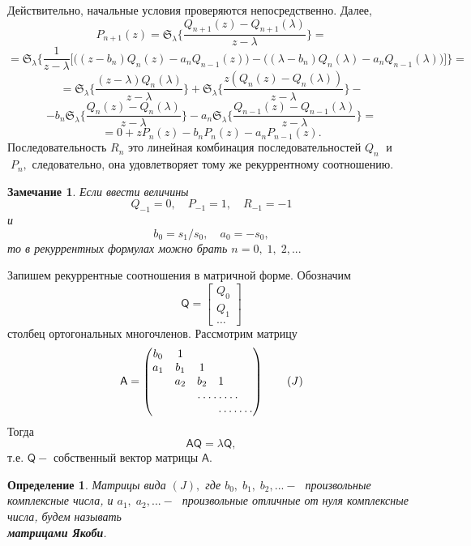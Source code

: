 \documentclass[12 pt, a4 paper]{article}
\theoremstyle{plain}   \newtheorem{Pro}{Задача}
\newtheorem{Def}{Определение}
\newtheorem{Rem}{Замечание}
\begin{document}
Действительно, начальные условия проверяются непосредственно.
Далее,
$$
  P_{n+1}(z)=\mathfrak{S}_{\lambda} \biggl \{
  \frac{Q_{n+1}(z)-Q_{n+1}(\lambda )}{z-\lambda}
  \biggr \}=
$$
$$
  =\mathfrak{S}_{\lambda} \biggl \{
  \frac{1}{z-\lambda} \biggl [ \biggl (
  (z-b_n )Q_n (z)-a_n Q_{n-1}(z) \biggr ) -
  \biggl ( (\lambda -b_n ) Q_n (\lambda ) -
  a_n Q_{n-1} (\lambda ) \biggr ) \biggr ] \biggr \} =
$$
$$
  =\mathfrak{S}_{\lambda} \biggl \{
  \frac{(z-\lambda )Q_n (\lambda ) }{z-\lambda} \biggr \} +
  \mathfrak{S}_{\lambda} \biggl \{
  \frac{z(Q_n (z)-Q_n (\lambda ))}{z-\lambda } \biggr \} -
$$
$$
  -b_n \mathfrak{S}_{\lambda} \biggl \{
  \frac{Q_n (z) - Q_n (\lambda )}{z-\lambda} \biggr \} -
  a_n \mathfrak{S}_{\lambda} \biggl \{
  \frac{Q_{n-1}(z)-Q_{n-1}(\lambda )}{z-\lambda} \biggr \}=
$$
$$
  = 0 + zP_n (z) - b_n P_n (z) -a_n P_{n-1}(z).
$$
Последовательность
$ R_n $
это линейная комбинация последовательностей
$ Q_n \; $
и
$ \; P_n , $
следовательно, она удовлетворяет тому же рекуррентному соотношению.
\\
$ \; $
\begin{Rem}
Если ввести величины
$$
  Q_{-1}=0, \quad P_{-1}=1, \quad R_{-1}=-1
$$
и
$$
  b_0 =s_1 /s_0 , \quad a_0 =-s_0 ,
$$
то в рекуррентных формулах можно брать
$ n=0, \; 1, \; 2,... $
\end{Rem}
$ \; $
\\

Запишем рекуррентные соотношения в матричной форме.
Обозначим
\begin{equation*}
  \mathsf{Q}=
    \begin{bmatrix}
	  Q_0 \\
	  Q_1 \\
	  \dots
	\end{bmatrix}
\end{equation*}
столбец ортогональных многочленов. Рассмотрим матрицу
\begin{equation*}
  \mathsf{A}=
    \begin{pmatrix}
	  b_0 & 1 & \; & \; & \; & \; \\
	  a_1 & b_1 & 1 & \; & \; & \; \\
	  \; & a_2 & b_2 & 1 & \; & \; \\
	  \; & \; & \hdotsfor{3} & \; \\
	  \; & \; & \; & \hdotsfor{3}
	\end{pmatrix}
  \qquad (J)
\end{equation*}
Тогда
$$
  \mathsf{A} \mathsf{Q} = \lambda \mathsf{Q},
$$
т.е.
$ \mathsf{Q} - $
собственный вектор матрицы
$ \mathsf{A}. $
\begin{Def}
Матрицы вида
$ (J) , $
где
$ b_0 , \; b_1 , \; b_2 ,... - \; $
произвольные комплексные числа, и
$ a_1 , \; a_2 ,... - \; $
произвольные отличные от нуля комплексные числа,
будем называть\\
{\bfseries матрицами Якоби}.
\end{Def}
\newpage
\end{document}
